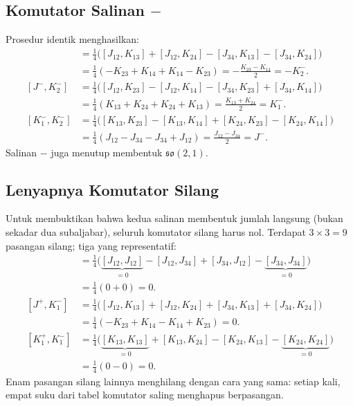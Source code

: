 \subsection{Komutator Salinan $-$}

Prosedur identik menghasilkan:
\begin{align}
    [J^-, K_1^-] &= \tfrac{1}{4}\big([J_{12},K_{13}] + [J_{12},K_{24}] - [J_{34},K_{13}] - [J_{34},K_{24}]\big) \nonumber\\
    &= \tfrac{1}{4}(-K_{23} + K_{14} + K_{14} - K_{23}) = -\frac{K_{23} - K_{14}}{2} = -K_2^-. \label{a3-eq:JmK1m}\\[6pt]
    [J^-, K_2^-] &= \tfrac{1}{4}\big([J_{12},K_{23}] - [J_{12},K_{14}] - [J_{34},K_{23}] + [J_{34},K_{14}]\big) \nonumber\\
    &= \tfrac{1}{4}(K_{13} + K_{24} + K_{24} + K_{13}) = \frac{K_{13} + K_{24}}{2} = K_1^-. \label{a3-eq:JmK2m}\\[6pt]
    [K_1^-, K_2^-] &= \tfrac{1}{4}\big([K_{13},K_{23}] - [K_{13},K_{14}] + [K_{24},K_{23}] - [K_{24},K_{14}]\big) \nonumber\\
    &= \tfrac{1}{4}(J_{12} - J_{34} - J_{34} + J_{12}) = \frac{J_{12} - J_{34}}{2} = J^-. \label{a3-eq:K1mK2m}
\end{align}
Salinan $-$ juga menutup membentuk $\mathfrak{so}(2,1)$.

\subsection{Lenyapnya Komutator Silang}

Untuk membuktikan bahwa kedua salinan membentuk jumlah langsung (bukan sekadar dua subaljabar), seluruh komutator silang harus nol. Terdapat $3 \times 3 = 9$ pasangan silang; tiga yang representatif:
\begin{align}
    [J^+, J^-] &= \tfrac{1}{4}\big(\underbrace{[J_{12},J_{12}]}_{=0} - [J_{12},J_{34}] + [J_{34},J_{12}] - \underbrace{[J_{34},J_{34}]}_{=0}\big) \nonumber\\
    &= \tfrac{1}{4}(0 + 0) = 0. \label{a3-eq:cross-JJ}\\[6pt]
    [J^+, K_1^-] &= \tfrac{1}{4}\big([J_{12},K_{13}] + [J_{12},K_{24}] + [J_{34},K_{13}] + [J_{34},K_{24}]\big) \nonumber\\
    &= \tfrac{1}{4}(-K_{23} + K_{14} - K_{14} + K_{23}) = 0. \label{a3-eq:cross-JK}\\[6pt]
    [K_1^+, K_1^-] &= \tfrac{1}{4}\big(\underbrace{[K_{13},K_{13}]}_{=0} + [K_{13},K_{24}] - [K_{24},K_{13}] - \underbrace{[K_{24},K_{24}]}_{=0}\big) \nonumber\\
    &= \tfrac{1}{4}(0 - 0) = 0. \label{a3-eq:cross-KK}
\end{align}
Enam pasangan silang lainnya menghilang dengan cara yang sama: setiap kali, empat suku dari tabel komutator saling menghapus berpasangan.

